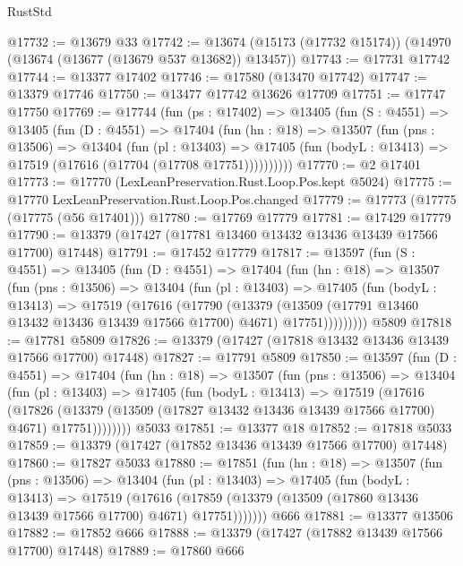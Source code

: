 \begin{lexlean}{RustStd}
\begin{coremodule}
@17732 := @13679 @33
@17742 := @13674 (@15173 (@17732 @15174)) (@14970 (@13674 (@13677 (@13679 @537 @13682)) @13457))
@17743 := @17731 @17742
@17744 := @13377 @17402
@17746 := @17580 (@13470 @17742)
@17747 := @13379 @17746
@17750 := @13477 @17742 @13626 @17709
@17751 := @17747 @17750
@17769 := @17744
    (fun (ps : @17402) =>
    @13405
      (fun (S : @4551) =>
      @13405
        (fun (D : @4551) =>
        @17404
          (fun (hn : @18) =>
          @13507
            (fun (pns : @13506) =>
            @13404
              (fun (pl : @13403) =>
              @17405 (fun (bodyL : @13413) => @17519 (@17616 (@17704 (@17708 @17751))))))))))
@17770 := @2 @17401
@17773 := @17770 (LexLeanPreservation.Rust.Loop.Pos.kept @5024)
@17775 := @17770 LexLeanPreservation.Rust.Loop.Pos.changed
@17779 := @17773 (@17775 (@17775 (@56 @17401)))
@17780 := @17769 @17779
@17781 := @17429 @17779
@17790 := @13379 (@17427 (@17781 @13460 @13432 @13436 @13439 @17566 @17700) @17448)
@17791 := @17452 @17779
@17817 := @13597
    (fun (S : @4551) =>
    @13405
      (fun (D : @4551) =>
      @17404
        (fun (hn : @18) =>
        @13507
          (fun (pns : @13506) =>
          @13404
            (fun (pl : @13403) =>
            @17405
              (fun (bodyL : @13413) =>
              @17519
                (@17616
                  (@17790
                    (@13379
                      (@13509 (@17791 @13460 @13432 @13436 @13439 @17566 @17700) @4671)
                      @17751)))))))))
    @5809
@17818 := @17781 @5809
@17826 := @13379 (@17427 (@17818 @13432 @13436 @13439 @17566 @17700) @17448)
@17827 := @17791 @5809
@17850 := @13597
    (fun (D : @4551) =>
    @17404
      (fun (hn : @18) =>
      @13507
        (fun (pns : @13506) =>
        @13404
          (fun (pl : @13403) =>
          @17405
            (fun (bodyL : @13413) =>
            @17519
              (@17616
                (@17826
                  (@13379 (@13509 (@17827 @13432 @13436 @13439 @17566 @17700) @4671) @17751))))))))
    @5033
@17851 := @13377 @18
@17852 := @17818 @5033
@17859 := @13379 (@17427 (@17852 @13436 @13439 @17566 @17700) @17448)
@17860 := @17827 @5033
@17880 := @17851
    (fun (hn : @18) =>
    @13507
      (fun (pns : @13506) =>
      @13404
        (fun (pl : @13403) =>
        @17405
          (fun (bodyL : @13413) =>
          @17519
            (@17616
              (@17859 (@13379 (@13509 (@17860 @13436 @13439 @17566 @17700) @4671) @17751)))))))
    @666
@17881 := @13377 @13506
@17882 := @17852 @666
@17888 := @13379 (@17427 (@17882 @13439 @17566 @17700) @17448)
@17889 := @17860 @666

\end{coremodule}
\end{lexlean}
